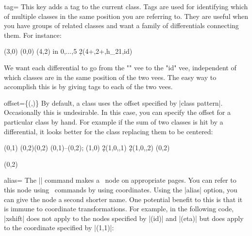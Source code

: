 \documentclass{ltxdoc}
\begin{document}
\begin{sseqdata}[name=ex1,degree={#1}{1-#1}]
\begin{key}{tag=}
This key adds a tag to the current class. Tags are used for identifying which of multiple classes in the same position you are referring to. They are useful when you have groups of related classes and want a family of differentials connecting them.  For instance:
\begin{codeexample}[]
\sseqnewgroup*{}
\sseqnewgroup{}
\begin{sseqpage}[degree={-1}{1},x range={0}{8},y range={0}{8}]
\tower(3,0)
\hvee[tag=id](0,0)
\hvee[tag=h_{21}](4,2)
\foreach \n in {0,...,5}{
    \d2(4+\n,2+\n,h_{21},id)
}
\end{sseqpage}
\end{codeexample}
We want each differential to go from the "" vee to the "id" vee, independent of which classes are in the same position of the two vees. The easy way to accomplish this is by giving tags to each of the two vees.
\end{key}

\begin{key}{offset=\{(,)\}}
By default, a class uses the offset specified by |class pattern|. Occasionally this is undesirable. In this case, you can specify the offset for a particular class by hand. For example if the sum of two classes is hit by a differential, it looks better for the class replacing them to be centered:
\begin{codeexample}[]
\begin{sseqdata}[name=offset example, Adams grading,class placement transform={scale=1.8}]
\class(0,1)
\class(0,2)\class(0,2)
\draw(0,1)--(0,2);
\class(1,0)
\d2(1,0,,1)
\d2(1,0,,2)
\replaceclass(0,2)
\end{sseqdata}
\printpage[name=offset example,page=2]
\printpage[name=offset example,page=3]
\begin{sseqpage}[name=offset example,page=3]
\classoptions[offset={(0,0)}](0,2)
\end{sseqpage}
\end{codeexample}
\end{key}


\begin{key}{alias=}
The |\class| command makes a \tikzname\ node on appropriate pages. You can refer to this node using \tikzname\ commands by using coordinates. Using the |alias| option, you can give the node a second shorter name. One potential benefit to this is that it is immune to coordinate transformations. For example, in the following code, |xshift| does not apply to the nodes specified by |(id)| and |(eta)| but does apply to the coordinate specified by |(1,1)|:


\end{key}
\end{sseqdata}
\end{document}

